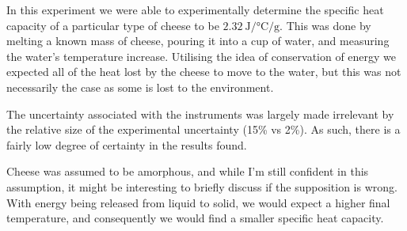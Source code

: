 In this experiment we were able to experimentally determine the specific heat capacity of a particular type of cheese to be $\SI{2.32}{\joule\per\celsius\per\gram}$. This was done by melting a known mass of cheese, pouring it into a cup of water, and measuring the water's temperature increase. Utilising the idea of conservation of energy we expected all of the heat lost by the cheese to move to the water, but this was not necessarily the case as some is lost to the environment.

The uncertainty associated with the instruments was largely made irrelevant by the relative size of the experimental uncertainty (15\% vs 2\%). As such, there is a fairly low degree of certainty in the results found.

Cheese was assumed to be amorphous, and while I'm still confident in this assumption, it might be interesting to briefly discuss if the supposition is wrong. With energy being released from liquid to solid, we would expect a higher final temperature, and consequently we would find a smaller specific heat capacity.